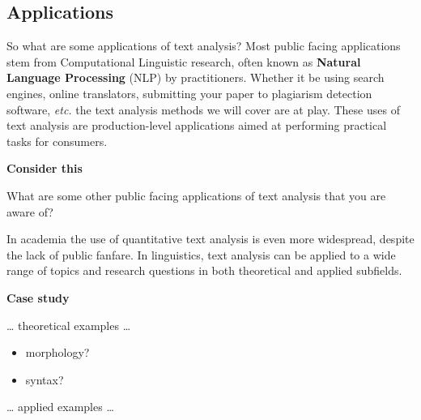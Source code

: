 \documentclass[
  letterpaper,
]{latex/krantz}
\providecommand{\tightlist}{%
  \setlength{\itemsep}{0pt}\setlength{\parskip}{0pt}}\usepackage{longtable,booktabs,array}
\begin{document}
\hypertarget{applications}{%
\subsection{Applications}\label{applications}}

So what are some applications of text analysis? Most public facing
applications stem from Computational Linguistic research, often known as
\textbf{Natural Language Processing} (NLP) by practitioners. Whether it
be using search engines, online translators, submitting your paper to
plagiarism detection software, \emph{etc.} the text analysis methods we
will cover are at play. These uses of text analysis are production-level
applications aimed at performing practical tasks for consumers.

\begin{tcolorbox}[enhanced jigsaw, arc=.35mm, leftrule=.75mm, rightrule=.15mm, opacityback=0, colback=white, breakable, bottomrule=.15mm, left=2mm, toprule=.15mm]

\textbf{ Consider this}

What are some other public facing applications of text analysis that you
are aware of?

\end{tcolorbox}

In academia the use of quantitative text analysis is even more
widespread, despite the lack of public fanfare. In linguistics, text
analysis can be applied to a wide range of topics and research questions
in both theoretical and applied subfields.

\begin{tcolorbox}[enhanced jigsaw, arc=.35mm, leftrule=.75mm, rightrule=.15mm, opacityback=0, colback=white, breakable, bottomrule=.15mm, left=2mm, toprule=.15mm]

\textbf{ Case study}

\ldots{} theoretical examples \ldots{}

\begin{itemize}
\tightlist
\item
  morphology?
\item
  syntax?
\end{itemize}

\end{tcolorbox}

\ldots{} applied examples \ldots{}
\end{document}
